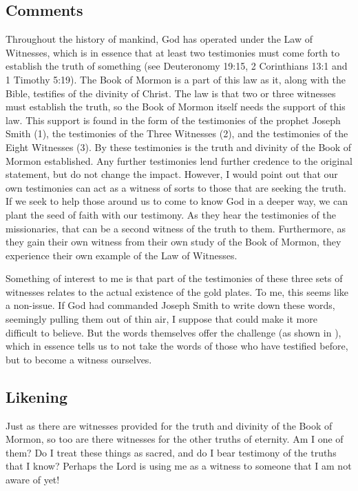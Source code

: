 \documentclass[12pt]{report}
\begin{document}
\subsection{Comments\label{intro:comments7}}
Throughout the history of mankind, God has operated under the Law of Witnesses, which is in essence that at least two testimonies must come forth to establish the truth of something (see Deuteronomy 19:15, 2 Corinthians 13:1 and 1 Timothy 5:19).  The Book of Mormon is a part of this law as it, along with the Bible, testifies of the divinity of Christ.  The law is that two or three witnesses must establish the truth, so the Book of Mormon itself needs the support of this law.  This support is found in the form of the testimonies of the prophet Joseph Smith (1), the testimonies of the Three Witnesses (2), and the testimonies of the Eight Witnesses (3).  By these testimonies is the truth and divinity of the Book of Mormon established.  Any further testimonies lend further credence to the original statement, but do not change the impact.  However, I would point out that our own testimonies can act as a witness of sorts to those that are seeking the truth.  If we seek to help those around us to come to know God in a deeper way, we can plant the seed of faith with our testimony.  As they hear the testimonies of the missionaries, that can be a second witness of the truth to them.  Furthermore, as they gain their own witness from their own study of the Book of Mormon, they experience their own example of the Law of Witnesses.

Something of interest to me is that part of the testimonies of these three sets of witnesses relates to the actual existence of the gold plates.  To me, this seems like a non-issue.  If God had commanded Joseph Smith to write down these words, seemingly pulling them out of thin air, I suppose that could make it more difficult to believe.  But the words themselves offer the challenge (as shown in ), which in essence tells us to not take the words of those who have testified before, but to become a witness ourselves.

\subsection{Likening\label{intro:likening7}}
Just as there are witnesses provided for the truth and divinity of the Book of Mormon, so too are there witnesses for the other truths of eternity.  Am I one of them?  Do I treat these things as sacred, and do I bear testimony of the truths that I know?  Perhaps the Lord is using me as a witness to someone that I am not aware of yet!
\end{document}
